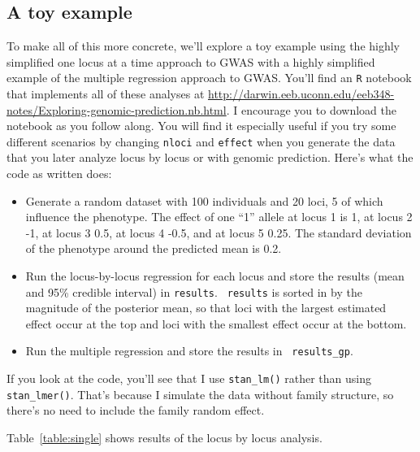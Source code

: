 \subsection*{A toy example}

To make all of this more concrete, we'll explore a toy example using
the highly simplified one locus at a time approach to GWAS with a
highly simplified example of the multiple regression approach to
GWAS. You'll find an {\tt R} notebook that implements all of these
analyses at
\url{http://darwin.eeb.uconn.edu/eeb348-notes/Exploring-genomic-prediction.nb.html}. I
encourage you to download the notebook as you follow along. You will
find it especially useful if you try some different scenarios by
changing {\tt nloci} and {\tt effect} when you generate the data that
you later analyze locus by locus or with genomic prediction. Here's
what the code as written does:

\begin{itemize}

\item Generate a random dataset with 100 individuals and 20 loci, 5 of
  which influence the phenotype. The effect of one ``1'' allele at
  locus 1 is 1, at locus 2 -1, at locus 3 0.5, at locus 4 -0.5, and at
  locus 5 0.25. The standard deviation of the phenotype around the
  predicted mean is 0.2.

\item Run the locus-by-locus regression for each locus and store the
  results (mean and 95\% credible interval) in {\tt results}. {\tt
    results} is sorted in by the magnitude of the posterior mean, so
  that loci with the largest estimated effect occur at the top and
  loci with the smallest effect occur at the bottom.

\item Run the multiple regression and store the results in {\tt
    results\_gp}.  
    
\end{itemize}

If you look at the code, you'll see that I use {\tt stan\_lm()} rather
than using {\tt stan\_lmer()}. That's because I simulate the data without
family structure, so there's no need to include the family random
effect.

Table~\ref{table:single} shows results of the locus by locus analysis.

